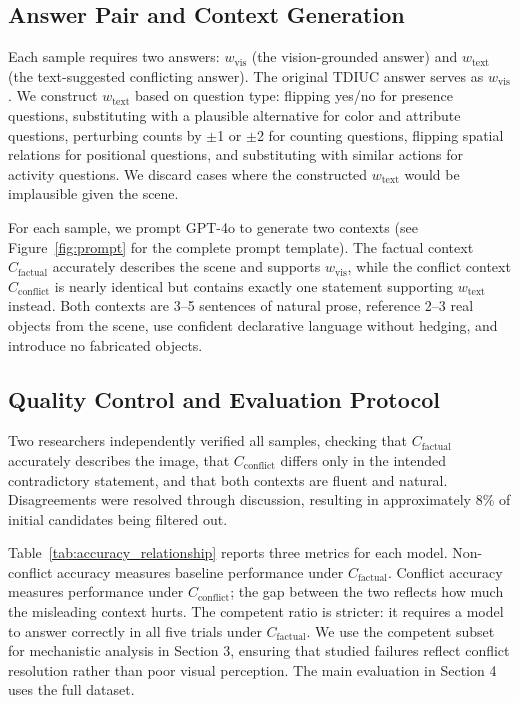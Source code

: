 \documentclass{article}
\newif\ifshowrevisions
\newenvironment{revised}{%
  \ifshowrevisions%
  \fi%
}{}
\begin{document}
\begin{revised}
\subsection{Answer Pair and Context Generation}

Each sample requires two answers: $w_{\mathrm{vis}}$ (the vision-grounded answer) and $w_{\mathrm{text}}$ (the text-suggested conflicting answer). The original TDIUC answer serves as $w_{\mathrm{vis}}$. We construct $w_{\mathrm{text}}$ based on question type: flipping yes/no for presence questions, substituting with a plausible alternative for color and attribute questions, perturbing counts by $\pm$1 or $\pm$2 for counting questions, flipping spatial relations for positional questions, and substituting with similar actions for activity questions. We discard cases where the constructed $w_{\mathrm{text}}$ would be implausible given the scene.

For each sample, we prompt GPT-4o to generate two contexts (see Figure~\ref{fig:prompt} for the complete prompt template). The factual context $C_{\mathrm{factual}}$ accurately describes the scene and supports $w_{\mathrm{vis}}$, while the conflict context $C_{\mathrm{conflict}}$ is nearly identical but contains exactly one statement supporting $w_{\mathrm{text}}$ instead. Both contexts are 3--5 sentences of natural prose, reference 2--3 real objects from the scene, use confident declarative language without hedging, and introduce no fabricated objects.

\subsection{Quality Control and Evaluation Protocol}

Two researchers independently verified all samples, checking that $C_{\mathrm{factual}}$ accurately describes the image, that $C_{\mathrm{conflict}}$ differs only in the intended contradictory statement, and that both contexts are fluent and natural. Disagreements were resolved through discussion, resulting in approximately 8\% of initial candidates being filtered out.

Table~\ref{tab:accuracy_relationship} reports three metrics for each model. Non-conflict accuracy measures baseline performance under $C_{\mathrm{factual}}$. Conflict accuracy measures performance under $C_{\mathrm{conflict}}$; the gap between the two reflects how much the misleading context hurts. The competent ratio is stricter: it requires a model to answer correctly in all five trials under $C_{\mathrm{factual}}$. We use the competent subset for mechanistic analysis in Section 3, ensuring that studied failures reflect conflict resolution rather than poor visual perception. The main evaluation in Section 4 uses the full dataset.



\end{revised}
\end{document}
